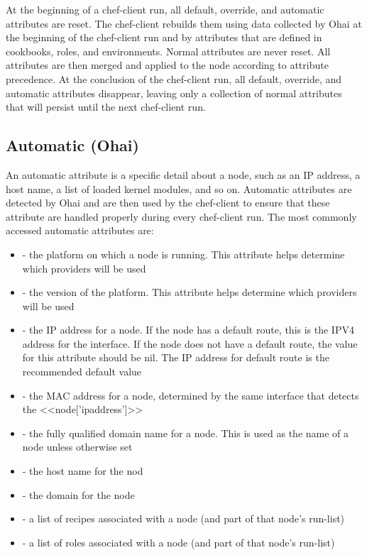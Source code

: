At the beginning of a chef-client run, all default, override, and automatic attributes are reset. The chef-client rebuilds them using data collected by Ohai at the beginning of the chef-client run and by attributes that are defined in cookbooks, roles, and environments. Normal attributes are never reset. All attributes are then merged and applied to the node according to attribute precedence. At the conclusion of the chef-client run, all default, override, and automatic attributes disappear, leaving only a collection of normal attributes that will persist until the next chef-client run.

\subsection{Automatic (Ohai)}

An automatic attribute is a specific detail about a node, such as an IP address, a host name, a list of loaded kernel modules, and so on. Automatic attributes are detected by Ohai and are then used by the chef-client to ensure that these attribute are handled properly during every chef-client run. The most commonly accessed automatic attributes are:

\begin{itemize}
  \item {} - the platform on which a node is running. This attribute helps determine which providers will be used
  \item {} - the version of the platform. This attribute helps determine which providers will be used
  \item {} - the IP address for a node. If the node has a default route, this is the IPV4 address for the interface. If the node does not have a default route, the value for this attribute should be nil. The IP address for default route is the recommended default value
  \item {} - the MAC address for a node, determined by the same interface that detects the <<node['ipaddress']>>
  \item {} - the fully qualified domain name for a node. This is used as the name of a node unless otherwise set
  \item {} - the host name for the nod
  \item {} - the domain for the node
  \item {} - a list of recipes associated with a node (and part of that node’s run-list)
  \item {} - a list of roles associated with a node (and part of that node’s run-list)
\end{itemize}

